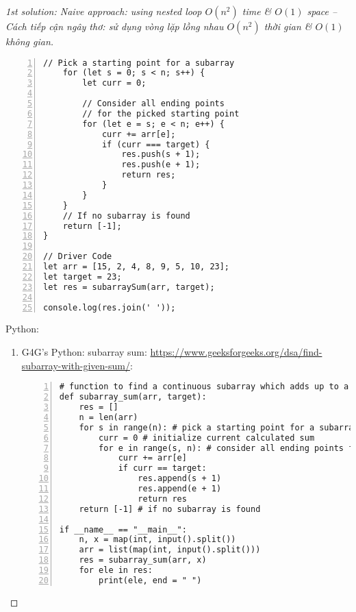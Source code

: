 \documentclass{article}
\begin{document}
\begin{proof}[1st solution: Naive approach: using nested loop $O(n^2)$ time \& $O(1)$ space -- Cách tiếp cận ngây thơ: sử dụng vòng lặp lồng nhau $O(n^2)$ thời gian \& $O(1)$ không gian]
\begin{Verbatim}[numbers=left,xleftmargin=5mm]
    // Pick a starting point for a subarray
    for (let s = 0; s < n; s++) {
        let curr = 0;

        // Consider all ending points
        // for the picked starting point
        for (let e = s; e < n; e++) {
            curr += arr[e];
            if (curr === target) {
                res.push(s + 1);
                res.push(e + 1);
                return res;
            }
        }
    }
    // If no subarray is found
    return [-1];
}

// Driver Code
let arr = [15, 2, 4, 8, 9, 5, 10, 23];
let target = 23;
let res = subarraySum(arr, target);

console.log(res.join(' '));
    \end{Verbatim}
    Python:
    \begin{enumerate}
        \item G4G's Python: subarray sum: \url{https://www.geeksforgeeks.org/dsa/find-subarray-with-given-sum/}:
        \begin{Verbatim}[numbers=left,xleftmargin=5mm]
# function to find a continuous subarray which adds up to a given number
def subarray_sum(arr, target):
    res = []
    n = len(arr)
    for s in range(n): # pick a starting point for a subarray
        curr = 0 # initialize current calculated sum
        for e in range(s, n): # consider all ending points for the picked starting point
            curr += arr[e]
            if curr == target:
                res.append(s + 1)
                res.append(e + 1)
                return res
    return [-1] # if no subarray is found

if __name__ == "__main__":
    n, x = map(int, input().split())
    arr = list(map(int, input().split()))
    res = subarray_sum(arr, x)
    for ele in res:
        print(ele, end = " ")
        \end{Verbatim}
    \end{enumerate}
\end{proof}
\end{document}
